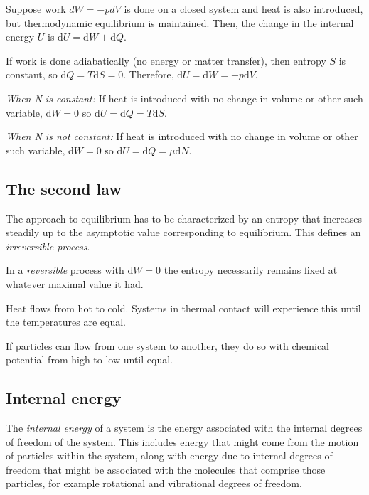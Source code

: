 
Suppose work $dW = -p dV$ is done on a closed system and heat is also introduced, but thermodynamic equilibrium is maintained. Then, the change in the internal energy $U$ is $\text{d}U = \text{d}W + \text{d}Q$.


If work is done adiabatically (no energy or matter transfer), then entropy $S$ is constant, so $\text{d}Q = T \text{d}S = 0$. Therefore, $\text{d}U = \text{d}W = -p \text{d}V$.


\textit{When N is constant:} If heat is introduced with no change in volume or other such variable, $\text{d}W = 0$ so $\text{d}U = \text{d}Q = T \text{d}S$.


\textit{When N is not constant:} If heat is introduced with no change in volume or other such variable, $\text{d}W = 0$ so $\text{d}U = \text{d}Q = \mu \text{d}N$.

\subsection{The second law}
The approach to equilibrium has to be characterized by an entropy that increases steadily up to the asymptotic value corresponding to equilibrium. This defines an \textit{irreversible process}.


In a \textit{reversible} process with $\text{d}W = 0$ the entropy necessarily remains fixed at whatever maximal value it had.


Heat flows from hot to cold. Systems in thermal contact will experience this until the temperatures are equal.


If particles can flow from one system to another, they do so with chemical potential from high to low until equal.

\subsection{Internal energy}
The \emph{internal energy} of a system is the energy associated with the internal degrees of freedom of the system. This includes energy that might come from the motion of particles within the system, along with energy due to internal degrees of freedom that might be associated with the molecules that comprise those particles, for example rotational and vibrational degrees of freedom. 

